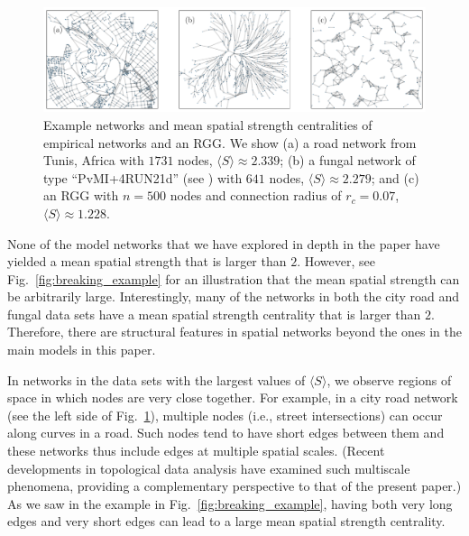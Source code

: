 \documentclass[%
 reprint,
 amsmath,amssymb,
 aps,
]{revtex4-1}
\begin{document}
\begin{figure}
    \centering
    \includegraphics[width=1.0\linewidth]{data_network_examples.pdf}
    \caption{Example networks and mean spatial strength centralities of empirical networks and an RGG. We show (a) a road network from Tunis, Africa with $1731$ nodes, $\langle S \rangle \approx 2.339$; (b) a fungal network of type ``Pv\textunderscore M\textunderscore I+4R\textunderscore U\textunderscore N\textunderscore 21d'' (see \cite{fungal_data}) with $641$ nodes, $\langle S \rangle \approx 2.279$; and (c) an RGG with $n = 500$ nodes and connection radius of $r_c = 0.07$, $\langle S \rangle \approx 1.228$.
    }
    \label{fig:data_network_examples}
\end{figure}


None of the model networks that we have explored in depth in the paper have yielded a mean spatial strength that is larger than $2$. However, see Fig.~\ref{fig:breaking_example} for an illustration that the mean spatial strength can be arbitrarily large. Interestingly, many of the networks in both the city road and fungal data sets have a mean spatial strength centrality that is larger than $2$. Therefore, there are structural features in spatial networks beyond the ones in the main models in this paper.

In networks in the data sets with the largest values of $\langle S \rangle$, we observe regions of space in which nodes are very close together.
For example, in a city road network (see the left side of Fig.~\ref{fig:data_network_examples}), multiple nodes (i.e., street intersections) can occur along curves in a road. Such nodes tend to have short edges between them and these networks thus include edges at multiple spatial scales. (Recent developments in topological data analysis \cite{feng2019} have examined such multiscale phenomena, providing a complementary perspective to that of the present paper.) As we saw in the example in Fig.~\ref{fig:breaking_example}, having both very long edges and very short edges can lead to a large mean spatial strength centrality.
\end{document}
